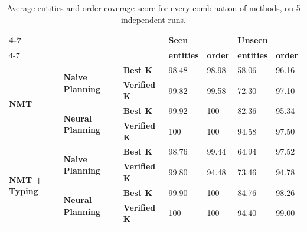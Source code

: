 
\begin{table}[t]
\begin{center}
\begin{tabular}{lll|l|l|l|l|}
\cline{4-7}
 &  &  & \multicolumn{2}{l|}{\textbf{Seen}} & \multicolumn{2}{l|}{\textbf{Unseen}} \\ \cline{4-7} 
 &  &  & \textbf{entities} & \textbf{order} & \textbf{entities} & \textbf{order} \\ \hline
\multicolumn{1}{|l|}{\multirow{4}{*}{\textbf{NMT}}} & \multicolumn{1}{l|}{\multirow{2}{*}{\textbf{Naive Planning}}} & \textbf{Best K} & 98.48 & 98.98 & 58.06 & 96.16 \\ \cline{3-7} 
\multicolumn{1}{|l|}{} & \multicolumn{1}{l|}{} & \textbf{Verified K} & 99.82 & 99.58 & 72.30 & 97.10 \\ \cline{2-7} 
\multicolumn{1}{|l|}{} & \multicolumn{1}{l|}{\multirow{2}{*}{\textbf{Neural Planning}}} & \textbf{Best K} & 99.92 & 100 & 82.36 & 95.34 \\ \cline{3-7} 
\multicolumn{1}{|l|}{} & \multicolumn{1}{l|}{} & \textbf{Verified K} & 100 & 100 & 94.58 & 97.50 \\ \hline
\multicolumn{1}{|l|}{\multirow{4}{*}{\textbf{NMT + Typing}}} & \multicolumn{1}{l|}{\multirow{2}{*}{\textbf{Naive Planning}}} & \textbf{Best K} & 98.76 & 99.44 & 64.94 & 97.52 \\ \cline{3-7} 
\multicolumn{1}{|l|}{} & \multicolumn{1}{l|}{} & \textbf{Verified K} & 99.80 & 94.48 & 73.46 & 94.78 \\ \cline{2-7} 
\multicolumn{1}{|l|}{} & \multicolumn{1}{l|}{\multirow{2}{*}{\textbf{Neural Planning}}} & \textbf{Best K} & 99.90 & 100 & 84.76 & 98.26 \\ \cline{3-7} 
\multicolumn{1}{|l|}{} & \multicolumn{1}{l|}{} & \textbf{Verified K} & 100 & 100 & 94.40 & 99.00 \\ \hline
\end{tabular}
\end{center}
\caption{Average entities and order coverage score for every combination of methods, on 5 independent runs.}
\label{table:coverage}
\end{table}